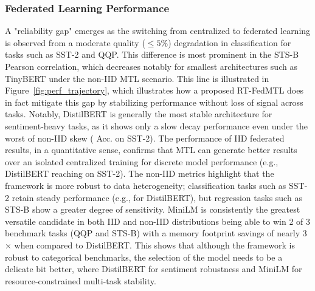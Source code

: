 \subsubsection{Federated Learning Performance} A "reliability gap" emerges as the switching from centralized to federated learning is observed from a moderate quality (${\le}5\%$) degradation in classification for tasks such as SST-2 and QQP. This difference is most prominent in the STS-B Pearson correlation, which decreases notably for smallest architectures such as TinyBERT under the non-IID MTL scenario. This line is illustrated in Figure~\ref{fig:perf_trajectory}, which illustrates how a proposed RT-FedMTL does in fact mitigate this gap by stabilizing performance without loss of signal across tasks. Notably, DistilBERT is generally the most stable architecture for sentiment-heavy tasks, as it shows only a slow decay performance even under the worst of non-IID skew ( Acc. on SST-2). The performance of IID federated results, in a quantitative sense, confirms that MTL can generate better results over an isolated centralized training for discrete model performance (e.g., DistilBERT reaching  on SST-2). The non-IID metrics highlight that the framework is more robust to data heterogeneity; classification tasks such as SST-2 retain steady performance (e.g.,  for DistilBERT), but regression tasks such as STS-B show a greater degree of sensitivity. MiniLM is consistently the greatest versatile candidate in both IID and non-IID distributions being able to win 2 of 3 benchmark tasks (QQP and STS-B) with a memory footprint savings of nearly 3$\times$ when compared to DistilBERT. This shows that although the framework is robust to categorical benchmarks, the selection of the model needs to be a delicate bit better, where DistilBERT for sentiment robustness and MiniLM for resource-constrained multi-task stability.


